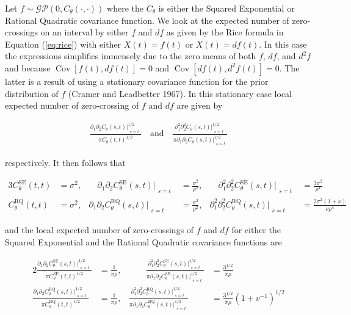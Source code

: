 \documentclass[11pt,]{article}
\DeclareMathOperator*{\Cov}{Cov}
\theoremstyle{nonumberplain}
\begin{document}
Let \(f \sim \mathcal{GP}\left(0, C_\theta(\cdot, \cdot)\right)\) where
the \(C_\theta\) is either the Squared Exponential or Rational Quadratic
covariance function. We look at the expected number of zero-crossings on
an interval by either \(f\) and \(df\) as given by the Rice formula in
Equation (\ref{eq:rice}) with either \(X(t) = f(t)\) or
\(X(t) = df(t)\). In this case the expressions simplifies immensely due
to the zero means of both \(f\), \(df\), and \(d^2\!f\) and because
\(\Cov[f(t), df(t)] = 0\) and \(\Cov[df(t), d^2\!f(t)] = 0\). The latter
is a result of using a stationary covariance function for the prior
distribution of \(f\) (Cramer and Leadbetter 1967). In this stationary
case local expected number of zero-crossing of \(f\) and \(df\) are
given by

\begin{align*}
  \frac{\partial_1 \partial_2 C_\theta(s,t)\Bigr|_{\substack{s=t}}^{1/2}}{\pi C_\theta(t,t)^{1/2}} \quad \text{and} \quad   \frac{\partial_1^2 \partial_2^2 C_\theta(s,t)\Bigr|_{\substack{s=t}}^{1/2}}{\pi \partial_1 \partial_2 C_\theta(s,t)\Bigr|_{\substack{s=t}}^{1/2}}
\end{align*}

respectively. It then follows that

\begin{alignat*}{3}
 C_\theta^\text{SE}(t,t) &= \sigma^2, &\quad \partial_1\partial_2 C_\theta^\text{SE}(s,t)\Bigr|_{\substack{s=t}} &= \frac{\sigma^2}{\rho^2}, &\quad \partial_1^2\partial_2^2 C_\theta^\text{SE}(s,t)\Bigr|_{\substack{s=t}} &= \frac{3\sigma^2}{\rho^4}\\   
 C_\theta^\text{RQ}(t,t) &= \sigma^2, & \partial_1\partial_2 C_\theta^\text{RQ}(s,t)\Bigr|_{\substack{s=t}} &= \frac{\sigma^2}{\rho^2}, & \partial_1^2\partial_2^2 C_\theta^\text{RQ}(s,t)\Bigr|_{\substack{s=t}} &= \frac{2\sigma^2 (1+\nu)}{\nu \rho^4}
\end{alignat*}

and the local expected number of zero-crossings of \(f\) and \(df\) for
either the Squared Exponential and the Rational Quadratic covariance
functions are

\begin{alignat*}{2}
 \frac{\partial_1 \partial_2 C_\theta^\text{SE}(s,t)\Bigr|_{\substack{s=t}}^{1/2}}{\pi C_\theta^\text{SE}(t,t)^{1/2}} &= \frac{1}{\pi\rho}, &\qquad \frac{\partial_1^2 \partial_2^2 C_\theta^\text{SE}(s,t)\Bigr|_{\substack{s=t}}^{1/2}}{\pi \partial_1 \partial_2 C_\theta^\text{SE}(s,t)\Bigr|_{\substack{s=t}}^{1/2}} &= \frac{3^{1/2}}{\pi\rho}\\  
 \frac{\partial_1 \partial_2 C_\theta^\text{RQ}(s,t)\Bigr|_{\substack{s=t}}^{1/2}}{\pi C_\theta^\text{RQ}(t,t)^{1/2}} &= \frac{1}{\pi\rho}, & \frac{\partial_1^2 \partial_2^2 C_\theta^\text{RQ}(s,t)\Bigr|_{\substack{s=t}}^{1/2}}{\pi \partial_1 \partial_2 C_\theta^\text{RQ}(s,t)\Bigr|_{\substack{s=t}}^{1/2}} &= \frac{3^{1/2}}{\pi\rho}\left(1 + v^{-1}\right)^{1/2}
\end{alignat*}
\end{document}
